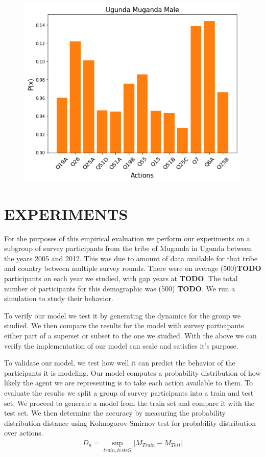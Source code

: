 {\begin{figure}[t!]
\begin{minipage}{0.32\textwidth}
		\includegraphics[width=\linewidth]{Images/botomupmale.png}
		\label{fig:ugundamugandabottomup}
	\end{minipage}
\end{figure}



\section{EXPERIMENTS}


For the purposes of this empirical evaluation we perform our experiments on a subgroup of survey participants from the tribe of Muganda in Ugunda between the years 2005 and 2012. This was due to amount of data available for that tribe and country between multiple survey rounds. There were on average (500)\textbf{TODO} participants on each year we studied, with gap years at \textbf{TODO}. The total number of participants for this demographic was (500) \textbf{TODO}. We run a simulation to study their behavior.

To verify our model we test it by generating the dynamics for the group we studied. We then compare the results for the model with survey participants either part of a superset or subset to the one we studied. With the above we can verify the implementation of our model can scale and satisfies it's purpose.

To validate our model, we test how well it can predict the behavior of the participants it is modeling. Our model computes a probability distribution of how likely the agent we are representing is to take each action available to them. To evaluate the results we split a group of survey participants into a train and test set. We proceed to generate a model from the train set and compare it with the test set. We then determine the accuracy by measuring the probability distribution distance using Kolmogorov-Smirnov test for probability distribution over actions. 
\begin{eqnarray}
D_n = \sup_{train,test \epsilon G}|M_{Train} - M_{Test}|
\end{eqnarray}

}

